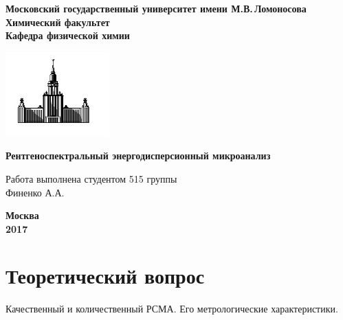 \documentclass[14pt]{extarticle}
\begin{document}
 

\begin{titlepage}
\centering
\textbf{\large Московский государственный университет имени М.В.\,Ломоносова\\
\vspace*{0.1cm} Химический факультет\\
\vspace*{0.1cm}
\noindent\makebox[\linewidth]{\rule{\paperwidth}{0.4pt}}
\vspace*{0.1cm}
 Кафедра физической химии}
\vspace*{2cm}

\begin{center}
\includegraphics[width=0.3\textwidth]{pictures/logo.jpg}
\end{center}

\vspace*{2cm}
\Large \textbf{Рентгеноспектральный энергодисперсионный микроанализ} 
\vspace*{6cm}

\begin{flushright}
\large Работа выполнена студентом 515 группы\\
Финенко А.А.\\
\end{flushright}
\vfill
\large\textbf{Москва\\ 2017}
\end{titlepage}

\section*{Теоретический вопрос}
Качественный и количественный РСМА. Его метрологические характеристики. \par
\end{document}
